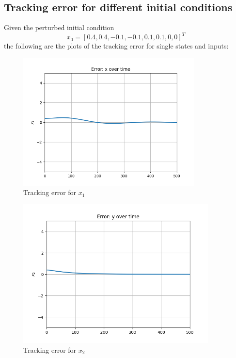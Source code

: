 \subsection{Tracking error for different initial conditions}

Given the perturbed initial condition \[ x_0 = [0.4, 0.4, -0.1, -0.1, 0.1, 0.1, 0, 0]^T\]
the following are the plots of the tracking error for single states and inputs: 


\begin{figure}[H]
\centering
\includegraphics[width=0.83\textwidth]{pictures/mpc11.png}
\caption{Tracking error for $x_1$}
\label{fig:mpc11}
\end{figure}

\begin{figure}[H]
\centering
\includegraphics[width=0.9\textwidth]{pictures/mpc12.png}
\caption{Tracking error for $x_2$}
\label{fig:mpc12}
\end{figure}

